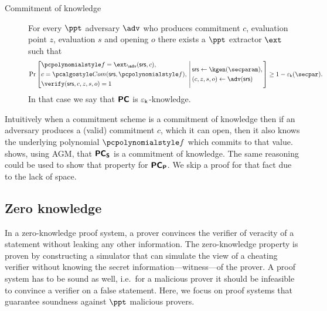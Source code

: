 \documentclass[runningheads,11pt]{llncs}
\theoremstyle{definition} \newtheorem{definition}[theorem]{Definition}
\begin{document}
\begin{description}
\item[Commitment of knowledge] For every $\ppt$ adversary $\adv$ who produces
  commitment $c$, evaluation point $z$, evaluation $s$ and opening $o$ there exists a
  $\ppt$ extractor $\ext$ such that
\[
  \Pr \left[
    \begin{aligned}
      & \p{f} = \ext_\adv(\srs, c),\\
      & c = \com(\srs, \p{f}),\\
      & \verify(\srs, c, z, s, o) = 1
    \end{aligned}
    \,\left|\,
      \vphantom{
        \begin{aligned}
          & \\
          & \\
          &
        \end{aligned}
        }
    \begin{aligned}
      & \srs \gets \kgen(\secparam),\\
      & (c, z, s, o) \gets \adv(\srs)
    \end{aligned}
  \right.\right]
  \geq 1 - \epsk(\secpar).
\]
In that case we say that $\bm{\mathsf{PC}}$ is $\varepsilon_{\mathsf{k}}$-knowledge.
\end{description}
Intuitively when a commitment scheme is a commitment of knowledge then if an
adversary produces a (valid) commitment $c$, which it can open, then it also
knows the underlying polynomial $\p{f}$ which commits to that value.
\cite{CCS:MBKM19} shows, using AGM, that $\bm{\mathsf{PC}}_{\bm{\mathsf{S}}}$ is a commitment of knowledge.
The same reasoning could be used to show that property for $\bm{\mathsf{PC}}_{\bm{\mathsf{P}}}$. We skip a
proof for that fact due to the lack of space.


\subsection{Zero knowledge}
In a zero-knowledge proof system, a prover convinces the verifier of veracity of
a statement without leaking any other information. The zero-knowledge property
is proven by constructing a simulator that can simulate the view of a cheating
verifier without knowing the secret information---witness---of the prover. A
proof system has to be sound as well, i.e.~for a malicious prover it should be
infeasible to convince a verifier on a false statement. Here, we focus on proof
systems that guarantee soundness against $\ppt$ malicious provers.
\end{document}
